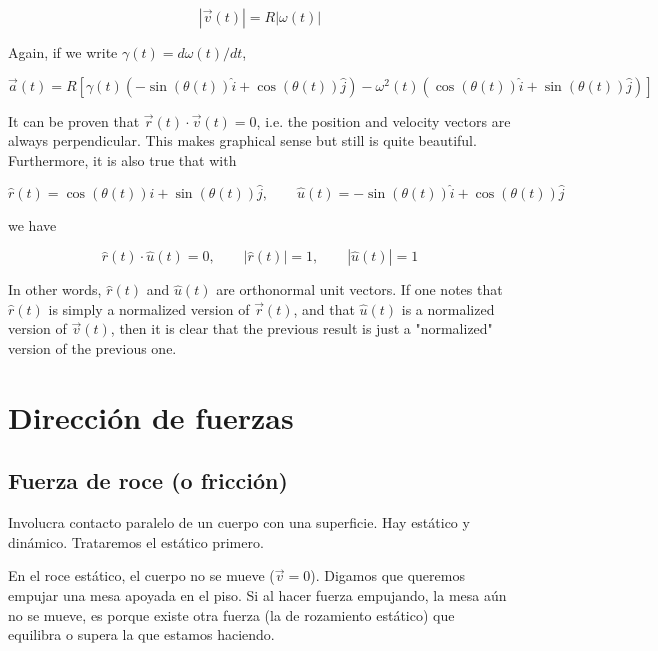 \documentclass[12pt]{article}
\theoremstyle{definition}
\begin{document}
\begin{equation}
    \left| \vec{v}(t) \right| = R \left| \omega(t) \right|
\end{equation}

Again, if we write $\gamma(t) = d\omega(t) / dt$, 

\begin{equation}
    \vec{a}(t) = R \left[ \gamma(t) \left( -\sin(\theta(t)) \hat{i} + \cos(\theta(t))
    \hat{j} \right) - \omega^2(t) \left( \cos(\theta(t)) \hat{i} + \sin(\theta(t))
    \hat{j} \right)  \right]
\end{equation}

It can be proven that $\vec{r}(t) \cdot \vec{v}(t) = 0$, i.e. the position and
velocity vectors are always perpendicular. This makes graphical sense but still
is quite beautiful. Furthermore, it is also true that  with 

\begin{equation*}
    \hat{r}(t) = \cos(\theta(t))\hat{i} + \sin(\theta(t))\hat{j}, \qquad
    \hat{u}(t) = - \sin(\theta(t))\hat{i} + \cos(\theta(t))\hat{j}
\end{equation*}

we have 

\begin{equation}
    \hat{r}(t) \cdot \hat{u}(t) = 0, \qquad \left| \hat{r}(t) \right| = 1,
    \qquad \left| \hat{u}(t) \right| = 1
\end{equation}

In other words, $\hat{r}(t)$ and $\hat{u}(t)$ are orthonormal unit vectors. If
one notes that $\hat{r}(t)$ is simply a normalized version of $\vec{r}(t)$, and 
that $\hat{u}(t)$ is a normalized version of $\vec{v}(t)$, then it is clear that
the previous result is just a "normalized" version of the previous one. 


\pagebreak 

\section{Dirección de fuerzas}

\subsection{Fuerza de roce (o fricción)}

Involucra contacto paralelo de un cuerpo con una superficie. Hay estático y
dinámico. Trataremos el estático primero. 

En el roce estático, el cuerpo no se mueve ($\vec{v} = 0$). Digamos que queremos
empujar una mesa apoyada en el piso. Si al hacer fuerza empujando, la mesa aún
no se mueve, es porque existe otra fuerza (la de rozamiento estático) que
equilibra o supera la que estamos haciendo. 
\end{document}
